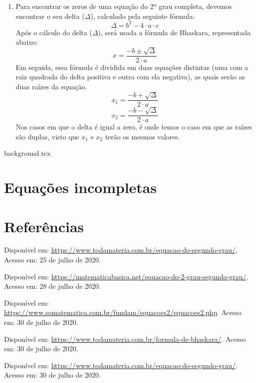 \documentclass[10pt]{article}
\begin{document}
\begin{enumerate}[label=\textbf{(\roman*)}]
    
    \item Para encontrar os zeros de uma equação do 2º grau completa, devemos encontrar o seu delta (\( \Delta \)), calculado pela seguinte fórmula:
     \[ \Delta= b^2-4 \cdot a \cdot c \]
     Após o cálculo do delta (\( \Delta \)), será usada a fórmula de Bhaskara, representada abaixo:
     \[ x= \frac{-b \pm \sqrt{\Delta}}{2 \cdot a}\]
     Em seguida, essa fórmula é dividida em duas equações distintas (uma com a raiz quadrada do delta positiva e outra com ela negativa), as quais serão as duas raízes da equação.
    \[ x_1= \frac{-b + \sqrt{\Delta}}{2 \cdot a}\]
    \[ x_2= \frac{-b - \sqrt{\Delta}}{2 \cdot a}\]
    Nos casos em que o delta é igual a zero, é onde temos o caso em que as raízes são duplas, visto que \( x_1 \) e \( x_2 \) terão os mesmos valores.
\end{enumerate}
\newpage
{background.tex} %
\section*{Equações incompletas}



\vfill
\section*{Referências}
\noindent Disponível em: \url{https://www.todamateria.com.br/equacao-do-segundo-grau/}. Acesso em: 25 de julho de 2020.

\noindent Disponível em: \url{https://matematicabasica.net/equacao-do-2-grau-segundo-grau/}. Acesso em: 28 de julho de 2020.

\noindent Disponível em: \url{https://www.somatematica.com.br/fundam/equacoes2/equacoes2.php}. Acesso em: 30 de julho de 2020.

\noindent Disponível em: \url{https://www.todamateria.com.br/formula-de-bhaskara/}. Acesso em: 30 de julho de 2020.

\noindent Disponível em: \url{https://www.todamateria.com.br/equacao-do-segundo-grau/}. Acesso em: 30 de julho de 2020.
\end{document}
